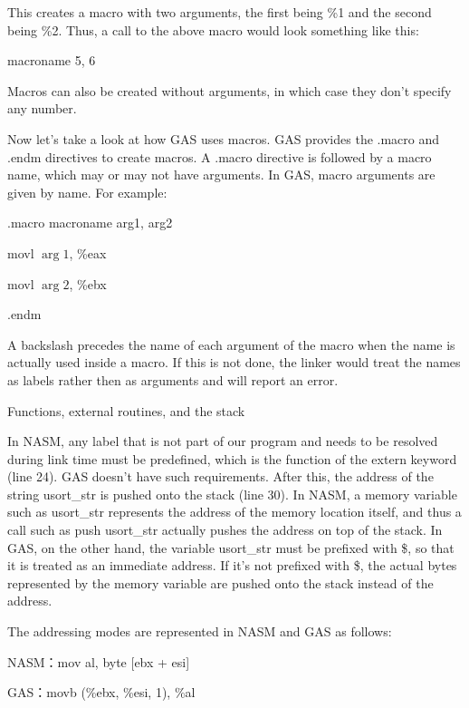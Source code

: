 \begin{flushleft}
This creates a macro with two arguments, the first being \%1 and the second being \%2. Thus, a call to the above macro would look something like this:

\quad macroname 5, 6

Macros can also be created without arguments, in which case they don't specify any number.

Now let's take a look at how GAS uses macros. GAS provides the .macro and .endm directives to create macros. A .macro directive is followed by a macro name, which may or may not have arguments. In GAS, macro arguments are given by name. For example:

\quad .macro macroname arg1, arg2

   \quad movl $\arg1$, \%eax
   
   \quad movl $\arg2$, \%ebx
   
\quad .endm

A backslash precedes the name of each argument of the macro when the name is actually used inside a macro. If this is not done, the linker would treat the names as labels rather then as arguments and will report an error.

\medskip
{\large Functions, external routines, and the stack}

In NASM, any label that is not part of our program and needs to be resolved during link time must be predefined, which is the function of the extern keyword (line 24). GAS doesn't have such requirements. After this, the address of the string usort\_str is pushed onto the stack (line 30). In NASM, a memory variable such as usort\_str represents the address of the memory location itself, and thus a call such as push usort\_str actually pushes the address on top of the stack. In GAS, on the other hand, the variable usort\_str must be prefixed with \$, so that it is treated as an immediate address. If it's not prefixed with \$, the actual bytes represented by the memory variable are pushed onto the stack instead of the address.

The addressing modes are represented in NASM and GAS as follows:

\quad NASM：mov al, byte [ebx + esi]

\quad GAS：movb (\%ebx, \%esi, 1), \%al
\end{flushleft}
